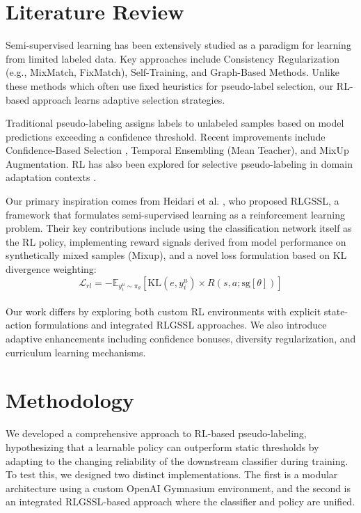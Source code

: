 \documentclass[pdflatex,sn-mathphys-num]{sn-jnl}%
\theoremstyle{thmstyleone}%
\theoremstyle{thmstyletwo}%
\theoremstyle{thmstylethree}%
\begin{document}
\section{Literature Review}\label{sec:lit_review}

Semi-supervised learning has been extensively studied as a paradigm for learning from limited labeled data. Key approaches include Consistency Regularization (e.g., MixMatch, FixMatch), Self-Training, and Graph-Based Methods. Unlike these methods which often use fixed heuristics for pseudo-label selection, our RL-based approach learns adaptive selection strategies.

Traditional pseudo-labeling assigns labels to unlabeled samples based on model predictions exceeding a confidence threshold. Recent improvements include Confidence-Based Selection \cite{sohn2020fixmatchsimplifyingsemisupervisedlearning}, Temporal Ensembling (Mean Teacher), and MixUp Augmentation. RL has also been explored for selective pseudo-labeling in domain adaptation contexts \cite{liu2020selectivepseudolabelingreinforcementlearning}.

Our primary inspiration comes from Heidari et al. \cite{heidari2024rlgssl}, who proposed RLGSSL, a framework that formulates semi-supervised learning as a reinforcement learning problem. Their key contributions include using the classification network itself as the RL policy, implementing reward signals derived from model performance on synthetically mixed samples (Mixup), and a novel loss formulation based on KL divergence weighting:
\\
\begin{equation}
\mathcal{L}_{rl} = -\mathbb{E}_{y_i^u \sim \pi_\theta} [\text{KL}(e, y_i^u) \times R(s,a;\text{sg}[\theta])]
\end{equation}
\\
Our work differs by exploring both custom RL environments with explicit state-action formulations and integrated RLGSSL approaches. We also introduce adaptive enhancements including confidence bonuses, diversity regularization, and curriculum learning mechanisms.

\section{Methodology}\label{sec:method}

We developed a comprehensive approach to RL-based pseudo-labeling, hypothesizing that a learnable policy can outperform static thresholds by adapting to the changing reliability of the downstream classifier during training. To test this, we designed two distinct implementations. The first is a modular architecture using a custom OpenAI Gymnasium environment, and the second is an integrated RLGSSL-based approach where the classifier and policy are unified.
\end{document}
